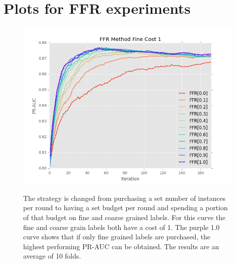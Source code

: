 \documentclass[ms]{nuthesis}
\begin{document}
%


\break

\FloatBarrier
\section{Plots for FFR experiments}
\begin{figure}[!htb]
	\centering
    \includegraphics[width=1.0\columnwidth]{fig/FFR_PR_Cost1_rnds0_171}
    \label{fig:FFR_PR_Cost1}
    \caption{The strategy is changed from purchasing a set number of instances
    per round to having a set budget per round and spending a portion of that budget
    on fine and coarse grained labels. For this curve the fine and coarse grain labels
    both have a cost of 1. The purple 1.0 curve shows that if only fine grained labels
    are purchased, the highest performing PR-AUC can be obtained. The results are an
    average of 10 folds.}
\end{figure}
\FloatBarrier
\end{document}
